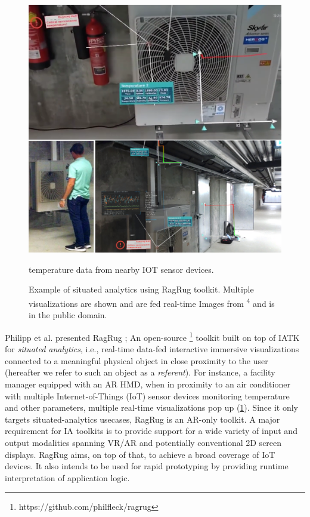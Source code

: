 \documentclass{vgtc}                          %
\begin{document}
\begin{figure}[tb]
	\centering
	\includegraphics[width=\columnwidth]{ragrug_example}
	\caption[Caption for RagRug]{Example of situated analytics using RagRug
		toolkit. Multiple visualizations are shown and are fed real-time
		Images from \textsuperscript{4} and is in the public domain. }
		temperature data from nearby IOT sensor devices.
	\label{fig:ragrug_example}
\end{figure}

Philipp et al. presented RagRug \cite{ragrug_toolkit}; An open-source
\footnote{https://github.com/philfleck/ragrug} toolkit built on top of IATK
for \textit{situated analytics}, i.e., real-time data-fed interactive immersive
visualizations connected to a meaningful physical object in close proximity to
the user (hereafter we refer to such an object as a \textit{referent}).
For instance, a facility manager equipped with an AR HMD, when in proximity to
an air conditioner with multiple Internet-of-Things (IoT)
sensor devices monitoring temperature and other parameters, multiple real-time
visualizations pop up (\ref{fig:ragrug_example}). Since it only targets
situated-analytics usecases, RagRug is an AR-only toolkit.
A major requirement for IA toolkits is to provide support for a wide variety of
input and output modalities spanning VR/AR and potentially conventional 2D
screen displays. RagRug aims, on top of that, to achieve a broad coverage of
IoT devices. It also intends to be used for rapid prototyping by providing
runtime interpretation of application logic.
\end{document}
